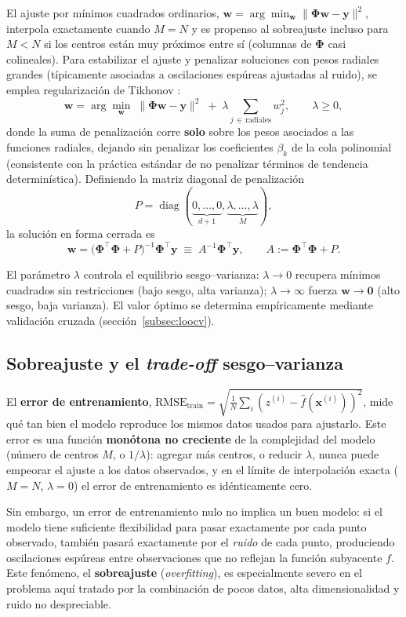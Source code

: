 \documentclass[11pt,a4paper]{article}
\newcommand{\Phimat}{\boldsymbol{\Phi}}
\newcommand{\wvec}{\mathbf{w}}
\newcommand{\yvec}{\mathbf{y}}
\begin{document}
El ajuste por m\'inimos cuadrados ordinarios, $\wvec = \arg\min_\wvec
\lVert \Phimat \wvec - \yvec\rVert^2$, interpola exactamente cuando $M=N$ y
es propenso al sobreajuste incluso para $M<N$ si los centros est\'an muy
pr\'oximos entre s\'i (columnas de $\Phimat$ casi colineales). Para
estabilizar el ajuste y penalizar soluciones con pesos radiales grandes
(t\'ipicamente asociadas a oscilaciones esp\'ureas ajustadas al ruido), se
emplea regularizaci\'on de Tikhonov \cite{hoerl1970,tikhonov1977}:
\[
\wvec = \arg\min_{\wvec} \; \lVert \Phimat \wvec - \yvec \rVert^2
\; + \; \lambda \sum_{j \,\in\, \text{radiales}} w_j^2 ,
\qquad \lambda \ge 0,
\]
donde la suma de penalizaci\'on corre \textbf{solo} sobre los pesos asociados
a las funciones radiales, dejando sin penalizar los coeficientes $\beta_k$ de
la cola polinomial (consistente con la pr\'actica est\'andar de no penalizar
t\'erminos de tendencia determin\'istica). Definiendo la matriz diagonal de
penalizaci\'on
\[
P = \operatorname{diag}(\underbrace{0,\dots,0}_{d+1},\underbrace{\lambda,\dots,\lambda}_{M}),
\]
la soluci\'on en forma cerrada es
\[
\wvec = \big(\Phimat^{\!\top}\Phimat + P\big)^{-1} \Phimat^{\!\top}\yvec
\;\equiv\; A^{-1}\Phimat^{\!\top}\yvec, \qquad A := \Phimat^{\!\top}\Phimat + P.
\]

El par\'ametro $\lambda$ controla el equilibrio sesgo--varianza: $\lambda\to0$
recupera m\'inimos cuadrados sin restricciones (bajo sesgo, alta varianza);
$\lambda\to\infty$ fuerza $\wvec\to\mathbf{0}$ (alto sesgo, baja varianza).
El valor \'optimo se determina emp\'iricamente mediante validaci\'on cruzada
(secci\'on~\ref{subsec:loocv}).

\subsection{Sobreajuste y el \emph{trade-off} sesgo--varianza}
\label{subsec:biasvar}

El \textbf{error de entrenamiento},
$\text{RMSE}_{\text{train}} = \sqrt{\tfrac1N\sum_i (z^{(i)}-\hat
f(\mathbf{x}^{(i)}))^2}$, mide qu\'e tan bien el modelo reproduce los mismos
datos usados para ajustarlo. Este error es una funci\'on \textbf{mon\'otona no
creciente} de la complejidad del modelo (n\'umero de centros $M$, o
$1/\lambda$): agregar m\'as centros, o reducir $\lambda$, nunca puede empeorar
el ajuste a los datos observados, y en el l\'imite de interpolaci\'on exacta
($M=N$, $\lambda=0$) el error de entrenamiento es id\'enticamente cero.

Sin embargo, un error de entrenamiento nulo no implica un buen modelo: si el
modelo tiene suficiente flexibilidad para pasar exactamente por cada punto
observado, tambi\'en pasar\'a exactamente por el \emph{ruido} de cada punto,
produciendo oscilaciones esp\'ureas entre observaciones que no reflejan la
funci\'on subyacente $f$. Este fen\'omeno, el \textbf{sobreajuste}
(\emph{overfitting}), es especialmente severo en el problema aqu\'i tratado
por la combinaci\'on de pocos datos, alta dimensionalidad y ruido no
despreciable.
\end{document}
